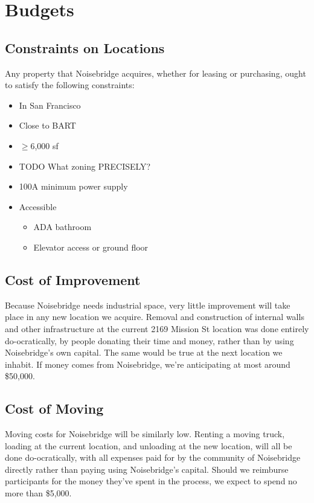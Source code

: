 \documentclass[12pt]{article}
\begin{document}
\section{Budgets}

\subsection{Constraints on Locations}

Any property that Noisebridge acquires, whether for leasing or purchasing, ought to satisfy the following constraints:

\begin{itemize}
    \item In San Francisco
    \item Close to BART
    \item $\geq$6,000 sf
    \item TODO What zoning PRECISELY?
    \item 100A minimum power supply
    \item Accessible
        \begin{itemize}
            \item ADA bathroom
            \item Elevator access or ground floor
        \end{itemize}
\end{itemize}

\subsection{Cost of Improvement}

Because Noisebridge needs industrial space, very little improvement will take place in any new location we acquire. Removal and construction of internal walls and other infrastructure at the current 2169 Mission St location was done entirely do-ocratically, by people donating their time and money, rather than by using Noisebridge's own capital. The same would be true at the next location we inhabit. If money comes from Noisebridge, we're anticipating at most around \$50,000.

\subsection{Cost of Moving}

Moving costs for Noisebridge will be similarly low. Renting a moving truck, loading at the current location, and unloading at the new location, will all be done do-ocratically, with all expenses paid for by the community of Noisebridge directly rather than paying using Noisebridge's capital. Should we reimburse participants for the money they've spent in the process, we expect to spend no more than \$5,000.
\end{document}
